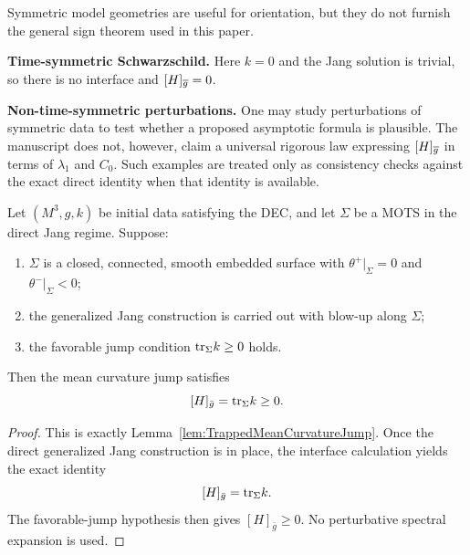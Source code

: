 \begin{remark}\label{prop:NumericalMCJump}
Symmetric model geometries are useful for orientation, but they do not furnish the general sign theorem used in this paper.

\textbf{Time-symmetric Schwarzschild.} Here $k=0$ and the Jang solution is trivial, so there is no interface and $[H]_{\overline{g}}=0$.

\textbf{Non-time-symmetric perturbations.} One may study perturbations of symmetric data to test whether a proposed asymptotic formula is plausible. The manuscript does not, however, claim a universal rigorous law expressing $[H]_{\overline{g}}$ in terms of $\lambda_1$ and $C_0$. Such examples are treated only as consistency checks against the exact direct identity when that identity is available.
\end{remark}

\begin{theorem}\label{thm:GeneralMCJump}
Let $(M^3, g, k)$ be initial data satisfying the DEC, and let $\Sigma$ be a MOTS in the direct Jang regime. Suppose:
\begin{enumerate}
    \item[(i)] $\Sigma$ is a closed, connected, smooth embedded surface with $\theta^+|_\Sigma = 0$ and $\theta^-|_\Sigma < 0$;
    \item[(ii)] the generalized Jang construction is carried out with blow-up along $\Sigma$;
    \item[(iii)] the favorable jump condition $\mathrm{tr}_\Sigma k \ge 0$ holds.
\end{enumerate}
Then the mean curvature jump satisfies
\begin{equation}\label{eq:GeneralMCJumpFormula}
    [H]_{\bar{g}} = \mathrm{tr}_\Sigma k \ge 0.
\end{equation}
\end{theorem}

\begin{proof}
This is exactly Lemma~\ref{lem:TrappedMeanCurvatureJump}. Once the direct generalized Jang construction is in place, the interface calculation yields the exact identity
\[
    [H]_{\bar g}=\mathrm{tr}_\Sigma k.
\]
The favorable-jump hypothesis then gives $[H]_{\bar g}\ge 0$. No perturbative spectral expansion is used.
\end{proof}

